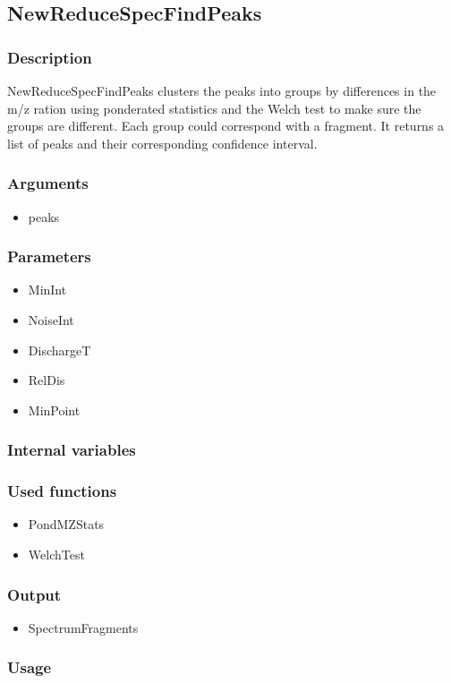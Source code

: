 \subsection{NewReduceSpecFindPeaks}\label{NewReduceSpecFindPeaks}
\subsubsection{Description}

NewReduceSpecFindPeaks clusters the peaks into groups by differences in the m/z ration using ponderated statistics and the Welch test to make sure the groups are different. Each group could correspond with a fragment. It returns a list of peaks and their corresponding confidence interval.

\subsubsection{Arguments}
\begin{itemize}
\item peaks
\end{itemize}
\subsubsection{Parameters}
\begin{itemize}
\item MinInt
\item NoiseInt
\item DischargeT
\item RelDis
\item MinPoint
\end{itemize}
\subsubsection{Internal variables}
\subsubsection{Used functions}
\begin{itemize}
\item PondMZStats
\item WelchTest
\end{itemize}
\subsubsection{Output}
\begin{itemize}
\item SpectrumFragments %
\end{itemize}

\subsubsection{Usage}

